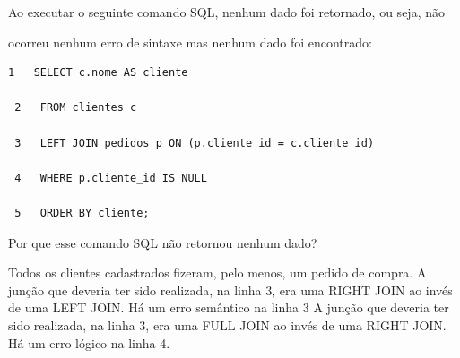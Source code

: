 \documentclass[12pt, addpoints]{exam}
\begin{document}
    \begin{questions}

    \newpage
    \question

Ao executar o seguinte comando SQL, nenhum dado foi retornado, ou seja, não

ocorreu nenhum erro de sintaxe mas nenhum dado foi encontrado:

\begin{tcolorbox}

 \begin{verbatim}1   SELECT c.nome AS cliente

 2   FROM clientes c

 3   LEFT JOIN pedidos p ON (p.cliente_id = c.cliente_id)

 4   WHERE p.cliente_id IS NULL

 5   ORDER BY cliente;

 \end{verbatim}

\end{tcolorbox}

Por que esse comando SQL não retornou nenhum dado?


\begin{choices}
\choice Todos os clientes cadastrados fizeram, pelo menos, um pedido de compra.
\choice A junção que deveria ter sido realizada, na linha 3, era uma RIGHT JOIN ao invés de uma LEFT JOIN.
\choice Há um erro semântico na linha 3
\choice A junção que deveria ter sido realizada, na linha 3, era uma FULL JOIN ao invés de uma RIGHT JOIN.
\choice Há um erro lógico na linha 4.
\end{choices}



    \end{questions}
    
\end{document}
